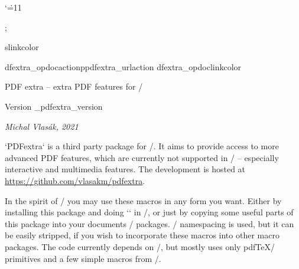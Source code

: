 \catcode`\.=11

\hyperlinks\Green\Green

\newcount\tnotenum
\def\tnotelist{}
\def\tnote#1{\incr\tnotenum $^{\rm\_romannumeral\tnotenum}$\global\addto\tnotelist{{#1}}}
\def\tnoteprint{\typoscale[920/920]\par \tnotenum=0
   \ea\foreach\tnotelist
     \do{\advance\tnotenum by1 \par $^{\rm\_romannumeral\tnotenum}$##1 }\par
   \global\tnotenum=0 \gdef\tnotelist{}%
}

\protected{}
\protected{}
\protected{}
\public \link \ilink \ulink ;

\let\_cslinkcolor\Blue

\let\_pdfextra_opdocaction\_pdfextra_urlaction
\let\_pdfextra_opdoclinkcolor\Blue
\def\_Xindex#1#2{\sdef{,#1}{}\slet{el:#1}{optexdoclink}}
\def\optexdoclink{\hlink[opdoc:\optexdocurl\#cs:\_tmpa]{\csstring\\\_tmpb}}
\def\optexdocurl{http://petr.olsak.net/ftp/olsak/optex/optex-doc.pdf}
\iftrue \fi

\tit PDF extra -- extra PDF features for \OpTeX/

\hfill Version \_pdfextra_version

\centerline{\it Michal Vlasák, 2021}
\bigskip

\noindent
`PDFextra` is a third party package for \OpTeX/. It aims to provide access to
more advanced PDF features, which are currently not supported in \OpTeX/ --
especially interactive and multimedia features. The development is hosted at
\url{https://github.com/vlasakm/pdfextra}.

In the spirit of \OpTeX/ you may use these macros in any form you want. Either
by installing this package and doing `\load[pdfextra]` in \OpTeX/, or just by
copying some useful parts of this package into your documents / packages.
\OpTeX/ namespacing is used, but it can be easily stripped, if you wish to
incorporate these macros into other macro packages. The code currently depends
on \LuaTeX/, but mostly uses only pdf\TeX/ primitives and a few simple macros
from \OpTeX/.

